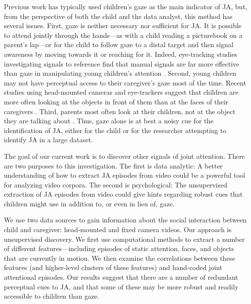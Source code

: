 \documentclass[10pt,letterpaper]{article}
\begin{document}
Previous work has typically used children's gaze as the main indicator of JA, but, from the perspective of both the child and the data analyst, this method has several issues. First, gaze is neither necessary nor sufficient for JA. It is possible to attend jointly through the hands---as with a child reading a picturebook on a parent's lap---or for the child to follow gaze to a distal target and then signal awareness by moving towards it or reaching for it. Indeed, eye-tracking studies investigating signals to reference find that manual signals are far more effective than gaze in manipulating young children's attention \cite{yurovsky2013}. Second, young children may not have perceptual access to their caregiver's gaze most of the time. Recent studies using head-mounted cameras and eye-trackers suggest that children are more often looking at the objects in front of them than at the faces of their caregivers \cite{smith2011,franchak2011,frank2013}. Third, parents most often look at their children, not at the object they are talking about \cite{frank2013b}. Thus, gaze alone is at best a noisy cue for the identification of JA, either for the child or for the researcher attempting to identify JA in a large dataset.

The goal of our current work is to discover other signals of joint attention. There are two purposes to this investigation. The first is data analytic: A better understanding of how to extract JA episodes from video could be a powerful tool for analyzing video corpora. The second is psychological: The unsupervised extraction of JA episodes from video could give hints regarding robust cues that children might use in addition to, or even in lieu of, gaze. 

We use two data sources to gain information about the social interaction between child and caregiver: head-mounted and fixed camera videos. Our approach is unsupervised discovery. We first use computational methods to extract a number of different features---including episodes of static attention, faces, and objects that are currently in motion. We then  examine the correlations between these features (and higher-level clusters of these features) and hand-coded joint attentional episodes. Our results suggest that there are a number of redundant perceptual cues to JA, and that some of these may be more robust and readily accessible to children than gaze.

\end{document}
